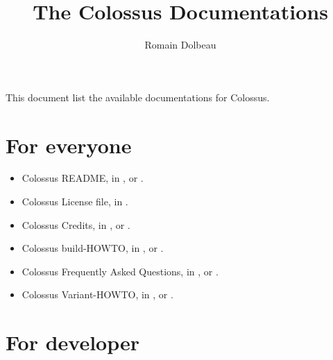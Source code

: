 \documentclass{article}
\begin{document}

\title{The Colossus Documentations}

\author{Romain Dolbeau}

\maketitle

This document list the available documentations for Colossus.

\section{For everyone}

\begin{itemize}

\item Colossus README, in ,  or .

\item Colossus License file, in .

\item Colossus Credits, in ,  or .

\item Colossus build-HOWTO, in ,  or .

\item Colossus Frequently Asked Questions, in ,  or .

\item Colossus Variant-HOWTO, in ,  or .

\end{itemize}

\section{For developer}
\end{document}
